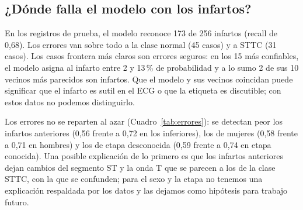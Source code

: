 \documentclass[conference]{IEEEtran}
\begin{document}
\subsection{¿Dónde falla el modelo con los infartos?}
En los registros de prueba, el modelo reconoce 173 de 256 infartos (recall de 0,68). Los errores van sobre todo a la clase normal (45 casos) y a STTC (31 casos). Los casos frontera más claros son errores seguros: en los 15 más confiables, el modelo asigna al infarto entre 2 y 13\,\% de probabilidad y a lo sumo 2 de sus 10 vecinos más parecidos son infartos. Que el modelo y sus vecinos coincidan puede significar que el infarto es sutil en el ECG o que la etiqueta es discutible; con estos datos no podemos distinguirlo.

Los errores no se reparten al azar (Cuadro~\ref{tab:errores}): se detectan peor los infartos anteriores (0,56 frente a 0,72 en los inferiores), los de mujeres (0,58 frente a 0,71 en hombres) y los de etapa desconocida (0,59 frente a 0,74 en etapa conocida). Una posible explicación de lo primero es que los infartos anteriores dejan cambios del segmento ST y la onda T que se parecen a los de la clase STTC, con la que se confunden; para el sexo y la etapa no tenemos una explicación respaldada por los datos y las dejamos como hipótesis para trabajo futuro.
\end{document}
